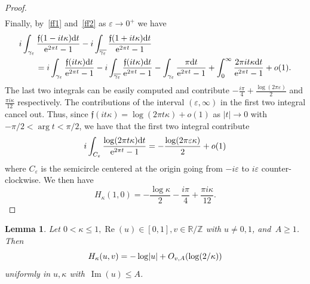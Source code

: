 \documentclass[11pt]{amsart}
\newcommand{\eps}{\varepsilon}
\newcommand{\R}{\mathbb{R}}
\newcommand{\Z}{\mathbb{Z}}
\newcommand{\lf}{{\mathfrak f}}
\newtheorem{lemma}{Lemma}
\theoremstyle{definition}
\newcommand{\pr}[1]{\mathchoice{\left( #1\right)}{(#1)}{(#1)}{(#1)}}
\newcommand{\e}[1][]{\ifthenelse{\equal{#1}{}}{{\rm e}}{\operatorname{e}\pr{ #1}}}
\newcommand{\df}{\mathrm{d}}
\renewcommand\Re{\operatorname{Re}}
\renewcommand\Im{\operatorname{Im}}
\newcommand{\1}{{\mathbf 1}}
\newcommand{\abs}[1]{\left|#1\right|}
\let\originalleft\left
\let\originalright\right
\renewcommand{\left}{\mathopen{}\mathclose\bgroup\originalleft}
\renewcommand{\right}{\aftergroup\egroup\originalright}
\numberwithin{equation}{section}
\begin{document}
\begin{proof}
\begin{align*}
  \end{align*}
  Finally, by~\eqref{ff1} and~\eqref{ff2} as $\eps\to0^+$ we have
  \begin{align*}
    & i \int_{\gamma_\eps}  \frac{\lf(1 - it\kappa )\df{t}}{\e^{2\pi t}-1}- i \int_{\overline{\gamma_\eps}}  \frac{\lf(1 + it\kappa)\df{t}}{\e^{2\pi t}-1}\\
    &\qquad= i \int_{\gamma_\eps}  \frac{\lf( it\kappa ) \df{t}}{\e^{2\pi t}-1}- i \int_{\overline{\gamma_\eps}}  \frac{\lf( it\kappa)\df{t}}{\e^{2\pi t}-1}- \int_{{\gamma_\eps}}  \frac{\pi  \df{t}}{\e^{2\pi t}-1} + \int_{0}^\infty \frac{  2\pi it\kappa\df{t}}{\e^{2\pi t}-1}+o(1).
  \end{align*}
  The last two integrals can be easily computed and contribute $-\frac{i\pi}4+\frac{\log(2\pi \eps)}2$ and $\frac{\pi i \kappa}{12}$ respectively. The contributions of the interval $(\eps,\infty)$ in the first two integral cancel out. Thus, since $\lf( it\kappa)=\log(2\pi  t \kappa)+o(1)$ as $|t|\to 0$ with $-\pi/2<\arg t<\pi/2$, we have that the first two integral contribute
  \[
    i \int_{C_\eps}  \frac{\log(2\pi  t \kappa) \df{t}}{\e^{2\pi t}-1}=-\frac{\log(2\pi \eps\kappa)}{2}+o(1)
  \]
  where $C_\eps$ is the semicircle centered at the origin going from $-i\eps$ to $i\eps$ counter-clockwise. We then have 
  \[
    H_\kappa(1,0)=-\frac{\log \kappa}{2}-\frac{i\pi}4+\frac{\pi i \kappa}{12}.
  \]
\end{proof}
\begin{lemma}\label{lwb}
  Let $0<\kappa\leq1 , \Re(u)\in [0,1], v\in\R/\Z$ with $u\neq0,1$, and~$A\geq 1$. 
  Then
  $$ H_\kappa(u,v) = -\log\abs{u} + O_{v, A}(\log(2/\kappa)) $$
  uniformly in $u,\kappa$ with~$\Im(u)\leq A$.
\end{lemma}
\end{document}
